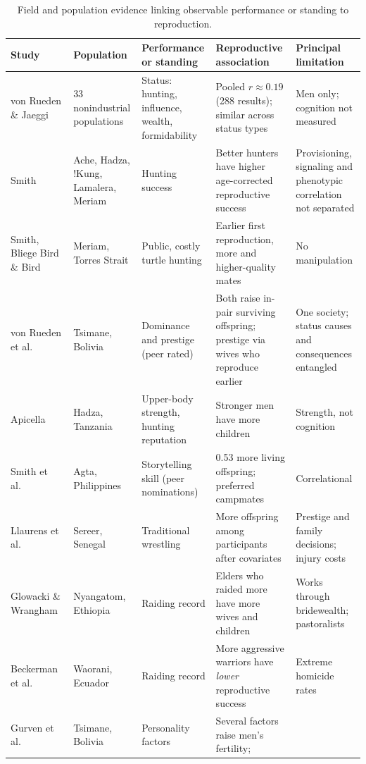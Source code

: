 \begin{table}[t]
\caption{Field and population evidence linking observable performance or standing to reproduction.}\label{tab:field}
\scriptsize
\begin{tabularx}{\textwidth}{@{}P{0.155\textwidth}P{0.15\textwidth}P{0.175\textwidth}LP{0.20\textwidth}@{}}
\toprule
Study & Population & Performance or standing & Reproductive association & Principal limitation\\
\midrule
von Rueden \& Jaeggi~\cite{vonrueden2016} & 33 nonindustrial populations & Status: hunting, influence, wealth, formidability &
Pooled $r\approx0.19$ (288 results); similar across status types & Men only; cognition not measured\\
Smith~\cite{smith2004} & Ache, Hadza, !Kung, Lamalera, Meriam & Hunting success & Better hunters have higher age-corrected
reproductive success & Provisioning, signaling and phenotypic correlation not separated\\
Smith, Bliege Bird \& Bird~\cite{smith2003} & Meriam, Torres Strait & Public, costly turtle hunting & Earlier first
reproduction, more and higher-quality mates & No manipulation\\
von Rueden et al.~\cite{vonrueden2011} & Tsimane, Bolivia & Dominance and prestige (peer rated) & Both raise in-pair surviving
offspring; prestige via wives who reproduce earlier & One society; status causes and consequences entangled\\
Apicella~\cite{apicella2014} & Hadza, Tanzania & Upper-body strength, hunting reputation & Stronger men have more children &
Strength, not cognition\\
Smith et al.~\cite{smith2017} & Agta, Philippines & Storytelling skill (peer nominations) & 0.53 more living offspring;
preferred campmates & Correlational\\
Llaurens et al.~\cite{llaurens2009} & Sereer, Senegal & Traditional wrestling & More offspring among participants after
covariates & Prestige and family decisions; injury costs\\
Glowacki \& Wrangham~\cite{glowacki2015} & Nyangatom, Ethiopia & Raiding record & Elders who raided more have more wives and
children & Works through bridewealth; pastoralists\\
Beckerman et al.~\cite{beckerman2009} & Waorani, Ecuador & Raiding record & More aggressive warriors have \emph{lower}
reproductive success & Extreme homicide rates\\
Gurven et al.~\cite{gurven2014} & Tsimane, Bolivia & Personality factors & Several factors raise men's fertility;

\end{tabularx}
\end{table}
